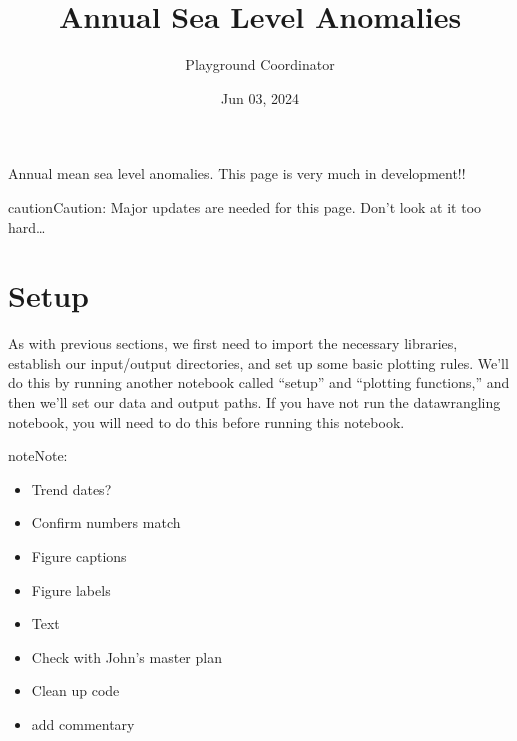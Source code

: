 \documentclass[letterpaper,10pt,english]{jupyterBook}
\title{Annual Sea Level Anomalies}
\date{Jun 03, 2024}
\author{Playground Coordinator}
\begin{document}
\pagestyle{empty}
\sphinxmaketitle
\pagestyle{plain}
\sphinxtableofcontents
\pagestyle{normal}
\label{\detokenize{notebooks/regional_and_local/SL_anomaly_annual::doc}}


\sphinxAtStartPar
Annual mean sea level anomalies. This page is very much in development!!

\begin{sphinxadmonition}{caution}{Caution:}
\sphinxAtStartPar
Major updates are needed for this page. Don’t look at it too hard…
\end{sphinxadmonition}


\part{Setup}
\label{\detokenize{notebooks/regional_and_local/SL_anomaly_annual:setup}}
\sphinxAtStartPar
As with previous sections, we first need to import the necessary libraries, establish our input/output directories, and set up some basic plotting rules. We’ll do this by running another notebook called “setup” and “plotting functions,” and then we’ll set our data and output paths. If you have not run the datawrangling notebook, you will need to do this before running this notebook.

\begin{sphinxShadowBox}
\sphinxstylesidebartitle{}

\begin{sphinxadmonition}{note}{Note:}
\sphinxAtStartPar
{}
\begin{itemize}
\item {} 
\sphinxAtStartPar
Trend dates?

\item {} 
\sphinxAtStartPar
Confirm numbers match

\item {} 
\sphinxAtStartPar
Figure captions

\item {} 
\sphinxAtStartPar
Figure labels

\item {} 
\sphinxAtStartPar
Text

\item {} 
\sphinxAtStartPar
Check with John’s master plan

\item {} 
\sphinxAtStartPar
Clean up code

\item {} 
\sphinxAtStartPar
add commentary

\end{itemize}
\end{sphinxadmonition}
\end{sphinxShadowBox}
\end{document}
